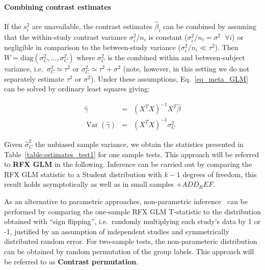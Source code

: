 \documentclass[preprint]{elsarticle}
\DeclareMathOperator{\Var}{Var}
\newcommand{\effectvector}{\hat\beta}
\newcommand{\effect}[1][i]{\effectvector_{#1}}
\newcommand{\vareffect}[1][i]{s^2_{#1}}
\newcommand{\nStudies}{k}
\newcommand{\varCombined}{\sigma^2_{C}}
\newcommand{\estvarCombined}{\hat\sigma^2_{C}}
\newcommand{\metaanalyticeffect}{\gamma}
\newcommand{\varBetween}{\tau^2}
\newcommand{\varWithinCommon}{\sigma^2}
\newcommand{\sampleSize}[1][i]{n_{#1}}
\newcommand{\varWithinCon}[1][i]{\sigma^2_{#1} / \sampleSize[#1]}
\newcommand{\transpose}{^T}
\begin{document}
\paragraph{Combining contrast estimates}
If the $\vareffect$ are unavailable, the contrast estimates $\effect$ can be combined by assuming that the within-study contrast variance $\varWithinCon$ is constant ($\varWithinCon = \sigma^2 \;\; \forall i$) or negligible in comparison to the between-study variance ($\varWithinCon \ll \varBetween$). Then $W = \mathrm{diag}( \varCombined, \ldots, \varCombined )$ where $\varCombined$ is the combined within and between-subject variance, i.e.\ $\varCombined \simeq \varBetween$ or $\varCombined \simeq \varBetween + \varWithinCommon$ (note, however, in this setting we do not separately estimate $\varBetween$ or $\varWithinCommon$). Under these assumptions, Eq.~\eqref{eq_meta_GLM} can be solved by ordinary least squares giving:

\begin{eqnarray}
	\hat \metaanalyticeffect  &=& (X\transpose X)^{-1} X\transpose \effectvector \\
	\Var(\hat \metaanalyticeffect)  &=& (X\transpose X)^{-1} \varCombined
	\label{eq_OLS}
\end{eqnarray}

Given $\estvarCombined$ the unbiased sample variance, we obtain the statistics presented in Table~\ref{table:estimates_test1} for one sample tests. This approach will be referred to \textbf{RFX GLM} in the following. Inference can be carried out by comparing the RFX GLM statistic to a Student distribution with $\nStudies-1$ degrees of freedom, this result holds asymptotically as well as in small samples $+ADD_REF$. 

As an alternative to parametric approaches, non-parametric inference~\cite{Holmes1996,Nichols2002} can be performed by comparing the one-sample RFX GLM T-statistic to the distribution obtained with ``sign flipping'', i.e.\ randomly multiplying each study's data by 1 or -1, justified by an assumption of independent studies and symmetrically distributed random error. For two-sample tests, the non-parameteric distribution can be obtained by random permutation of the group labels. This approach will be referred to as \textbf{Contrast permutation}.

\end{document}
